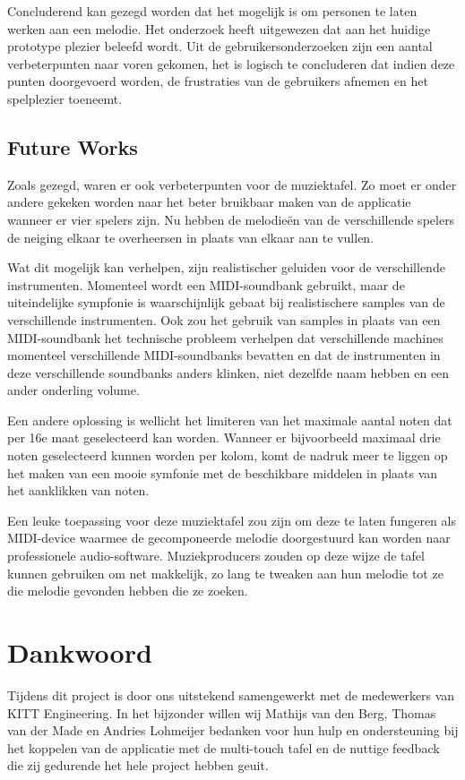 \documentclass{acm}
\begin{document}
Concluderend kan gezegd worden dat het mogelijk is om personen te laten werken aan een melodie. Het onderzoek heeft uitgewezen dat aan het huidige prototype plezier beleefd wordt. Uit de gebruikersonderzoeken zijn een aantal verbeterpunten naar voren gekomen, het is logisch te concluderen dat indien deze punten doorgevoerd worden, de frustraties van de gebruikers afnemen en het spelplezier toeneemt.


\subsection{Future Works}
Zoals gezegd, waren er ook verbeterpunten voor de muziektafel. Zo moet er onder andere gekeken worden naar het beter bruikbaar maken van de applicatie wanneer er vier spelers zijn. Nu hebben de melodie\"en van de verschillende spelers de neiging elkaar te overheersen in plaats van elkaar aan te vullen.

Wat dit mogelijk kan verhelpen, zijn realistischer geluiden voor de verschillende instrumenten. Momenteel wordt een MIDI-soundbank gebruikt, maar de uiteindelijke sympfonie is waarschijnlijk gebaat bij realistischere samples van de verschillende instrumenten. Ook zou het gebruik van samples in plaats van een MIDI-soundbank het technische probleem verhelpen dat verschillende machines momenteel verschillende MIDI-soundbanks bevatten en dat de instrumenten in deze verschillende soundbanks anders klinken, niet dezelfde naam hebben en een ander onderling volume.

Een andere oplossing is wellicht het limiteren van het maximale aantal noten dat per 16e maat geselecteerd kan worden. Wanneer er bijvoorbeeld maximaal drie noten geselecteerd kunnen worden per kolom, komt de nadruk meer te liggen op het maken van een mooie symfonie met de beschikbare middelen in plaats van het aanklikken van noten.

Een leuke toepassing voor deze muziektafel zou zijn om deze te laten fungeren als MIDI-device waarmee de gecomponeerde melodie doorgestuurd kan worden naar professionele audio-software. Muziekproducers zouden op deze wijze de tafel kunnen gebruiken om net makkelijk, zo lang te tweaken aan hun melodie tot ze die melodie gevonden hebben die ze zoeken.

\section{Dankwoord}
Tijdens dit project is door ons uitstekend samengewerkt met de medewerkers van KITT Engineering. In het bijzonder willen wij Mathijs van den Berg, Thomas van der Made en Andries Lohmeijer bedanken voor hun hulp en ondersteuning bij het koppelen van de applicatie met de multi-touch tafel en de nuttige feedback die zij gedurende het hele project hebben geuit.
\end{document}

